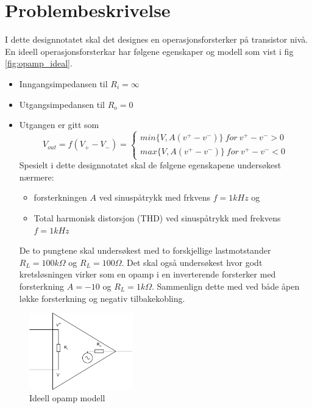 \clearpage
\section{Problembeskrivelse}
\label{problemBeskrivelse}



I dette designnotatet skal det designes en operasjonsforsterker på transistor nivå. En ideell operasjonsforsterkar har følgene egenskaper og modell som vist i fig \autoref{fig:opamp_ideal}.
\begin{itemize}
    \item Inngangsimpedansen til $R_i = \infty$
    \item Utgangsimpedansen til $R_o = 0$
    \item Utgangen er gitt som 
    \begin{equation}
        V_{out} = f(V_+ - V_-) = \begin{cases} 
                                    min \{V, A(v^+ - v^-)\}\ for\ v^+ - v^- > 0 \\
                                    max\{V, A(v^+ - v^-)\}\ for\ v^+ - v^- < 0
                                \end{cases}
    \end{equation}
    \label{eq:opamp}
Spesielt i dette designnotatet skal de følgene egenskapene undersøkest nærmere:
    \begin{itemize}
        \item forsterkningen $A$ ved sinuspåtrykk med frkvens $f = 1kHz$ og 
        \item Total harmonisk distorsjon (THD) ved sinuspåtrykk med frekvens $f = 1kHz$

        
    \end{itemize}
De to pungtene skal undersøkest med to forskjellige lastmotstander $R_L = 100k\Omega$ og $R_L = 100\Omega$. Det skal også undersøkest hvor godt kretsløsningen virker som en opamp i en inverterende forsterker med forsterkning $A = -10$ og $R_L = 1k\Omega$. Sammenlign dette med ved både åpen løkke forsterkning og negativ tilbakekobling.
\end{itemize}

\begin{figure}[h]
    \centering
    \includegraphics[width=0.4\textwidth]{Bilder/opamp_ideell.drawio.png}
    \caption{Ideell opamp modell}
    \label{fig:opamp_ideal}
\end{figure}
